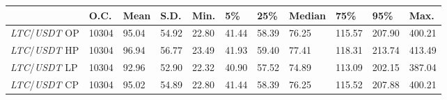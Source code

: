 \begin{tabular}{lllllllllll}
\toprule
 & \textbf{O.C.} & \textbf{Mean} & \textbf{S.D.} & \textbf{Min.} & \textbf{5\%} & \textbf{25\%} & \textbf{Median} & \textbf{75\%} & \textbf{95\%} & \textbf{Max.} \\
\midrule
\emph{LTC}/\emph{USDT} OP & 10304 & 95.04 & 54.92 & 22.80 & 41.44 & 58.39 & 76.25 & 115.57 & 207.90 & 400.21 \\
\emph{LTC}/\emph{USDT} HP & 10304 & 96.94 & 56.77 & 23.49 & 41.93 & 59.40 & 77.41 & 118.31 & 213.74 & 413.49 \\
\emph{LTC}/\emph{USDT} LP & 10304 & 92.96 & 52.90 & 22.32 & 40.90 & 57.52 & 74.89 & 113.09 & 202.15 & 387.04 \\
\emph{LTC}/\emph{USDT} CP & 10304 & 95.02 & 54.89 & 22.80 & 41.44 & 58.39 & 76.25 & 115.52 & 207.88 & 400.21 \\
\bottomrule
\end{tabular}
